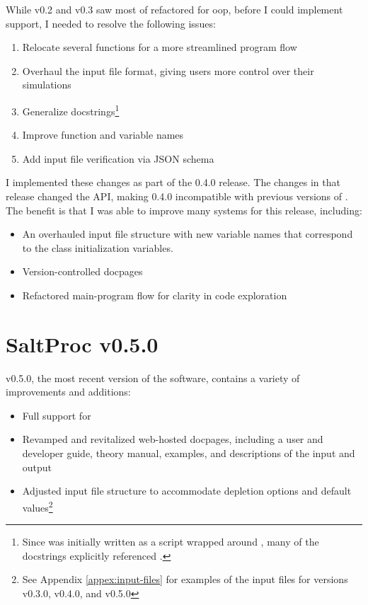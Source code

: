 While v0.2 and v0.3 saw most of \SaltProc refactored for \Gls{oop}, before I could
implement \OpenMC support, I needed to resolve the following issues:
\begin{enumerate}
    \item Relocate several functions for a more streamlined program flow
    \item Overhaul the \SaltProc input file format, giving users more control over their simulations
    \item Generalize docstrings\footnote{Since \SaltProc was initially written as a script wrapped around \SerpentTWO, many of the docstrings explicitly referenced \SerpentTWO.}
    \item Improve function and variable names
    \item Add input file verification via JSON schema
\end{enumerate}
I implemented these changes as part of the 0.4.0 release. The changes in that
release changed the API, making 0.4.0 incompatible with previous versions of
\SaltProc. The benefit is that I was able to improve many systems for this
release, including:
\begin{itemize}
    \item An overhauled input file structure with new variable names that
    correspond to the class initialization variables.
    \item Version-controlled docpages
    \item Refactored main-program flow for clarity in code exploration
\end{itemize}

\section{SaltProc v0.5.0}
\label{sec:saltproc-detail}

\SaltProc v0.5.0, the most recent version of the software, contains a variety of
improvements and additions:
\begin{itemize}
    \item Full support for \OpenMC
    \item Revamped and revitalized web-hosted docpages, including a
    user and developer guide, theory manual, examples, and descriptions of
    the input and output
    \item Adjusted input file structure to accommodate \OpenMC depletion 
    options and default values\footnote{See Appendix \ref{appex:input-files}
    for examples of the input files for versions v0.3.0, v0.4.0, and v0.5.0}
\end{itemize}

